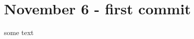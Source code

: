 \chapter{November 6 -\/ first commit}
\hypertarget{md_updates_2_november__5-something}{}\label{md_updates_2_november__5-something}
\label{md_updates_2_november__5-something_autotoc_md0}%
%
 some text 